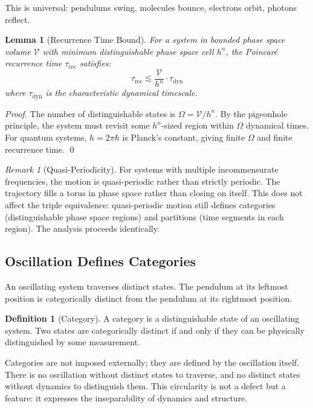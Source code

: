 \documentclass[twocolumn,10pt]{article}
\newtheorem{lemma}[theorem]{Lemma}
\theoremstyle{definition}
\newtheorem{definition}[theorem]{Definition}
\theoremstyle{remark}
\newtheorem{remark}[theorem]{Remark}
\begin{document}
This is universal: pendulums swing, molecules bounce, electrons orbit, photons reflect.

\begin{lemma}[Recurrence Time Bound]
\label{lem:recurrence}
For a system in bounded phase space volume $\mathcal{V}$ with minimum distinguishable phase space cell $h^n$, the Poincar\'e recurrence time $\tau_{\text{rec}}$ satisfies:
\begin{equation}
\tau_{\text{rec}} \lesssim \frac{\mathcal{V}}{h^n} \cdot \tau_{\text{dyn}}
\end{equation}
where $\tau_{\text{dyn}}$ is the characteristic dynamical timescale.
\end{lemma}

\begin{proof}
The number of distinguishable states is $\Omega = \mathcal{V}/h^n$. By the pigeonhole principle, the system must revisit some $h^n$-sized region within $\Omega$ dynamical times. For quantum systems, $h = 2\pi\hbar$ is Planck's constant, giving finite $\Omega$ and finite recurrence time. \qed
\end{proof}

\begin{remark}[Quasi-Periodicity]
For systems with multiple incommensurate frequencies, the motion is quasi-periodic rather than strictly periodic. The trajectory fills a torus in phase space rather than closing on itself. This does not affect the triple equivalence: quasi-periodic motion still defines categories (distinguishable phase space regions) and partitions (time segments in each region). The analysis proceeds identically.
\end{remark}

\subsection{Oscillation Defines Categories}

An oscillating system traverses distinct states. The pendulum at its leftmost position is categorically distinct from the pendulum at its rightmost position.

\begin{definition}[Category]
\label{def:category}
A category is a distinguishable state of an oscillating system. Two states are categorically distinct if and only if they can be physically distinguished by some measurement.
\end{definition}

Categories are not imposed externally; they are defined by the oscillation itself. There is no oscillation without distinct states to traverse, and no distinct states without dynamics to distinguish them. This circularity is not a defect but a feature: it expresses the inseparability of dynamics and structure.
\end{document}
